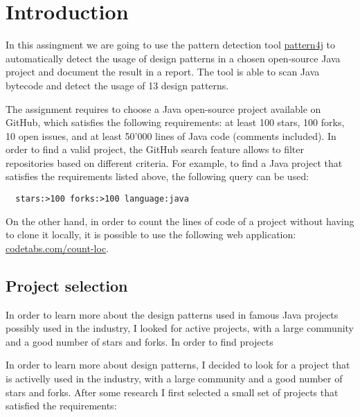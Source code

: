 \section{Introduction}

In this assingment we are going to use the pattern detection tool \href{https://users.encs.concordia.ca/~nikolaos/pattern\_detection.html}{pattern4j} to automatically detect the usage of design patterns in a chosen open-source Java project and document the result in a report. The tool is able to scan Java bytecode and detect the usage of 13 design patterns.

The assignment requires to choose a Java open-source project available on GitHub, which satisfies the following requirements: at least 100 stars, 100 forks, 10 open issues, and at least 50'000 lines of Java code (comments included). In order to find a valid project, the GitHub search feature allows to filter repositories based on different criteria. For example, to find a Java project that satisfies the requirements listed above, the following query can be used:

\begin{verbatim}
  stars:>100 forks:>100 language:java
\end{verbatim}

\noindent On the other hand, in order to count the lines of code of a project without having to clone it locally, it is possible to use the following web application: \href{https://codetabs.com/count-loc/count-loc-online.html}{codetabs.com/count-loc}.

\subsection{Project selection}

In order to learn more about the design patterns used in famous Java projects possibly used in the industry, I looked for active projects, with a large community and a good number of stars and forks. In order to find projects

In order to learn more about design patterns, I decided to look for a project that is activelly used in the industry, with a large community and a good number of stars and forks. After some research I first selected a small set of projects that satisfied the requirements:

